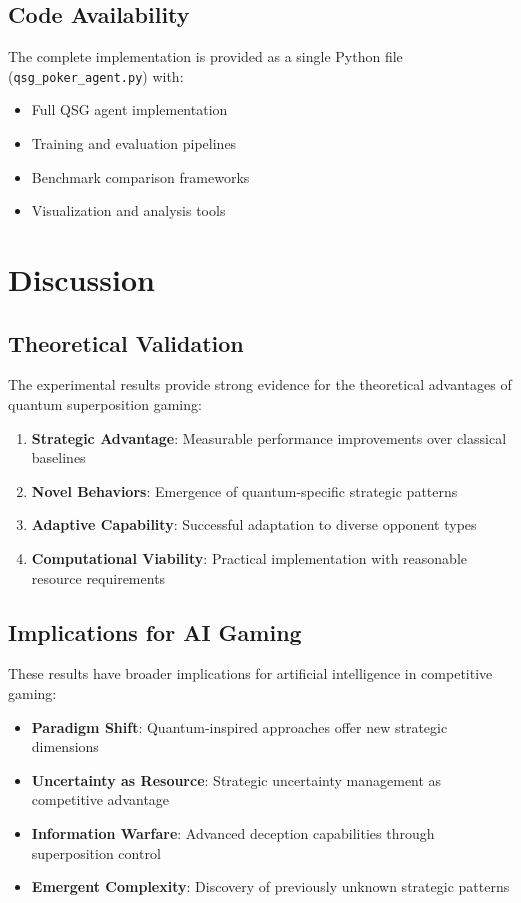\documentclass[11pt,a4paper]{article}
\begin{document}
\subsection{Code Availability}

The complete implementation is provided as a single Python file (\texttt{qsg\_poker\_agent.py}) with:

\begin{itemize}
\item Full QSG agent implementation
\item Training and evaluation pipelines
\item Benchmark comparison frameworks
\item Visualization and analysis tools
\end{itemize}

\section{Discussion}

\subsection{Theoretical Validation}

The experimental results provide strong evidence for the theoretical advantages of quantum superposition gaming:

\begin{enumerate}
\item \textbf{Strategic Advantage}: Measurable performance improvements over classical baselines
\item \textbf{Novel Behaviors}: Emergence of quantum-specific strategic patterns
\item \textbf{Adaptive Capability}: Successful adaptation to diverse opponent types
\item \textbf{Computational Viability}: Practical implementation with reasonable resource requirements
\end{enumerate}

\subsection{Implications for AI Gaming}

These results have broader implications for artificial intelligence in competitive gaming:

\begin{itemize}
\item \textbf{Paradigm Shift}: Quantum-inspired approaches offer new strategic dimensions
\item \textbf{Uncertainty as Resource}: Strategic uncertainty management as competitive advantage
\item \textbf{Information Warfare}: Advanced deception capabilities through superposition control
\item \textbf{Emergent Complexity}: Discovery of previously unknown strategic patterns
\end{itemize}
\end{document}
